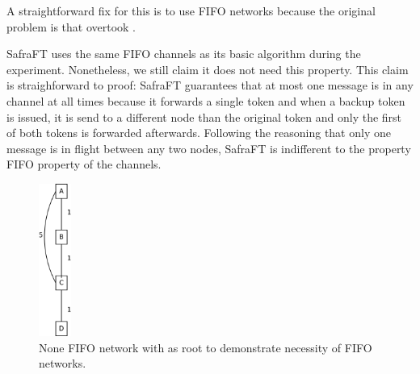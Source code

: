   A straightforward fix for this is to use FIFO networks because the original problem is that  overtook .
  
  SafraFT uses the same FIFO channels as its basic algorithm during the experiment.
  Nonetheless, we still claim it does not need this property.
  This claim is straighforward to proof: SafraFT guarantees that at most one message is in any channel at all times because it forwards a single token and when a backup token is issued, it is send to a different node than the original token and only the first of both tokens is forwarded afterwards.
  Following the reasoning that only one message is in flight between any two nodes, SafraFT is indifferent to the property FIFO property of the channels.
  
  \begin{figure}[h]
  	\includegraphics[height=5cm]{figures/FIFO_necessary}
  	\centering
  	\caption{None FIFO network with  as root to demonstrate necessity of FIFO networks.}	
  	\label{fig:fifoNecessaryNetwork}
  \end{figure}
    
